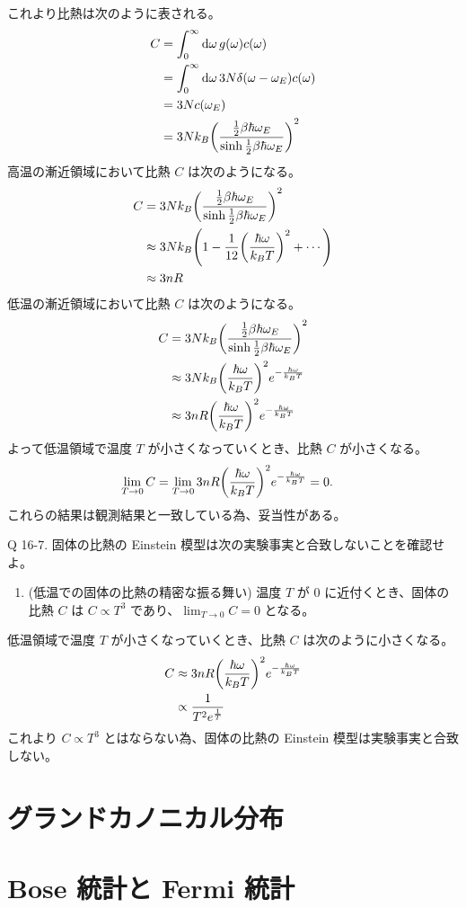 \documentclass[uplatex,dvipdfmx,a4paper,11pt]{jlreq}
\theoremstyle{definition}
\begin{document}
これより比熱は次のように表される。
\begin{align}
  C & = \int_0^\infty\dd{\omega}g(\omega)c(\omega)                                            \\
    & = \int_0^\infty\dd{\omega}3N\delta(\omega - \omega_E)c(\omega)                          \\
    & = 3Nc(\omega_E)                                                                         \\
    & = 3Nk_B\qty(\frac{\frac{1}{2}\beta\hbar\omega_E}{\sinh\frac{1}{2}\beta\hbar\omega_E})^2
\end{align}
高温の漸近領域において比熱 $C$ は次のようになる。
\begin{align}
  C & = 3Nk_B\qty(\frac{\frac{1}{2}\beta\hbar\omega_E}{\sinh\frac{1}{2}\beta\hbar\omega_E})^2 \\
    & \approx 3Nk_B\qty(1 - \frac{1}{12}\qty(\frac{\hbar\omega}{k_BT})^2 + \cdots)            \\
    & \approx 3nR
\end{align}
低温の漸近領域において比熱 $C$ は次のようになる。
\begin{align}
  C & = 3Nk_B\qty(\frac{\frac{1}{2}\beta\hbar\omega_E}{\sinh\frac{1}{2}\beta\hbar\omega_E})^2 \\
    & \approx 3Nk_B\qty(\frac{\hbar\omega}{k_BT})^2e^{-\frac{\hbar\omega}{k_BT}}              \\
    & \approx 3nR\qty(\frac{\hbar\omega}{k_BT})^2e^{-\frac{\hbar\omega}{k_BT}}
\end{align}
よって低温領域で温度 $T$ が小さくなっていくとき、比熱 $C$ が小さくなる。
\begin{align}
  \lim_{T\to 0} C & = \lim_{T\to 0}3nR\qty(\frac{\hbar\omega}{k_BT})^2e^{-\frac{\hbar\omega}{k_BT}} = 0.
\end{align}
これらの結果は観測結果と一致している為、妥当性がある。

\begin{itembox}[l]{Q 16-7.}
  固体の比熱の Einstein 模型は次の実験事実と合致しないことを確認せよ。
  \begin{enumerate}
    \item (低温での固体の比熱の精密な振る舞い) 温度 $T$ が $0$ に近付くとき、固体の比熱 $C$ は $C \propto T^3$ であり、$\lim_{T\to 0} C = 0$ となる。
  \end{enumerate}
\end{itembox}
低温領域で温度 $T$ が小さくなっていくとき、比熱 $C$ は次のように小さくなる。
\begin{align}
  C & \approx 3nR\qty(\frac{\hbar\omega}{k_BT})^2e^{-\frac{\hbar\omega}{k_BT}} \\
    & \propto \frac{1}{T^{2}e^{\frac{1}{T}}}
\end{align}
これより $C \propto T^3$ とはならない為、固体の比熱の Einstein 模型は実験事実と合致しない。

\section{グランドカノニカル分布}

\section{Bose 統計と Fermi 統計}
\end{document}
